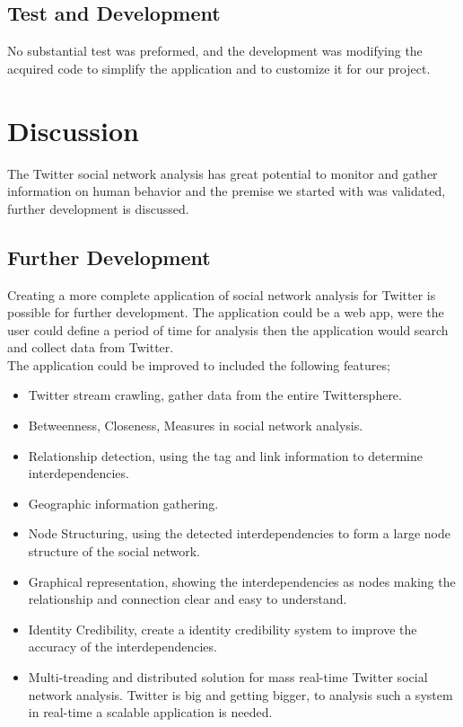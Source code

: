 \documentclass[]{article}  %
\begin{document}
\subsection{Test and Development}

No substantial test was preformed, and the development was modifying the acquired code to simplify the application and to customize it for our project. 


\section{Discussion}

The Twitter social network analysis has great potential to monitor and gather information on human behavior and the premise we started with was validated, further development is discussed. 

\subsection{Further Development}

Creating a more complete application of social network analysis for Twitter is possible for further development. The application could be a web app, were the user could define a period of time for analysis then the application would search and collect data from Twitter. \\ The application could be improved to included the following features;

\begin{itemize}
	\item Twitter stream crawling, gather data from the entire Twittersphere.
	\item Betweenness, Closeness, Measures in social network analysis.
	\item Relationship detection, using the tag and link information to determine interdependencies.
	\item Geographic information gathering.
	\item Node Structuring, using the detected interdependencies to form a large node structure of the social network.
	\item Graphical representation, showing the interdependencies as nodes making the relationship and connection clear and easy to understand.
	\item Identity Credibility, create a identity credibility system to improve the accuracy of the interdependencies.
	\item Multi-treading and distributed solution for mass real-time Twitter social network analysis. Twitter is big and getting bigger, to analysis such a system in real-time a scalable application is needed.
\end{itemize}
\end{document}
